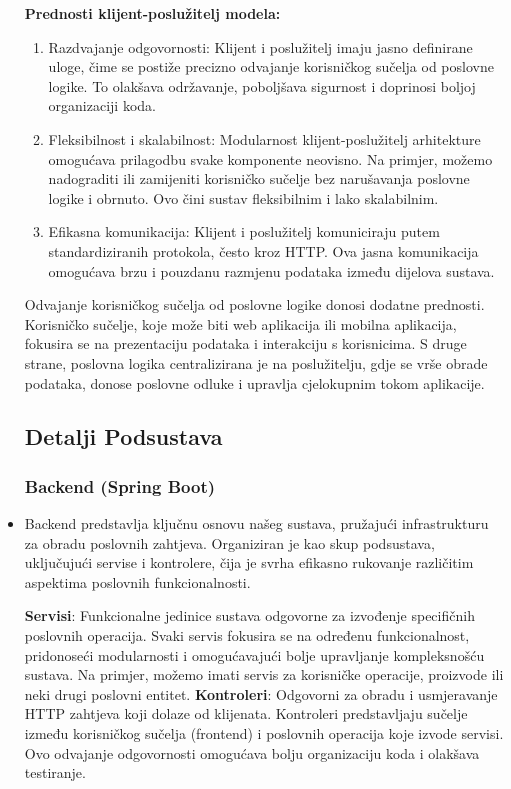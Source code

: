 \begin{itemize}
\textbf{Prednosti klijent-poslužitelj modela:}

\begin{enumerate}
    \item Razdvajanje odgovornosti: Klijent i poslužitelj imaju jasno definirane uloge, čime se postiže precizno odvajanje korisničkog sučelja od poslovne logike. To olakšava održavanje, poboljšava sigurnost i doprinosi boljoj organizaciji koda.
    \item Fleksibilnost i skalabilnost: Modularnost klijent-poslužitelj arhitekture omogućava prilagodbu svake komponente neovisno. Na primjer, možemo nadograditi ili zamijeniti korisničko sučelje bez narušavanja poslovne logike i obrnuto. Ovo čini sustav fleksibilnim i lako skalabilnim.
    \item Efikasna komunikacija: Klijent i poslužitelj komuniciraju putem standardiziranih protokola, često kroz HTTP. Ova jasna komunikacija omogućava brzu i pouzdanu razmjenu podataka između dijelova sustava.
\end{enumerate}
 
Odvajanje korisničkog sučelja od poslovne logike donosi dodatne prednosti. Korisničko sučelje, koje može biti web aplikacija ili mobilna aplikacija, fokusira se na prezentaciju podataka i interakciju s korisnicima. S druge strane, poslovna logika centralizirana je na poslužitelju, gdje se vrše obrade podataka, donose poslovne odluke i upravlja cjelokupnim tokom aplikacije. 

\subsection*{Detalji Podsustava}
\subsubsection*{Backend (Spring Boot)}
\item Backend predstavlja ključnu osnovu našeg sustava, pružajući infrastrukturu za obradu poslovnih zahtjeva. Organiziran je kao skup podsustava, uključujući servise i kontrolere, čija je svrha efikasno rukovanje različitim aspektima poslovnih funkcionalnosti.

\textbf{Servisi}: Funkcionalne jedinice sustava odgovorne za izvođenje specifičnih poslovnih operacija. Svaki servis fokusira se na određenu funkcionalnost, pridonoseći modularnosti i omogućavajući bolje upravljanje kompleksnošću sustava. Na primjer, možemo imati servis za korisničke operacije, proizvode ili neki drugi poslovni entitet.\newline
\textbf{Kontroleri}: Odgovorni za obradu i usmjeravanje HTTP zahtjeva koji dolaze od klijenata. Kontroleri predstavljaju sučelje između korisničkog sučelja (frontend) i poslovnih operacija koje izvode servisi. Ovo odvajanje odgovornosti omogućava bolju organizaciju koda i olakšava testiranje.




\end{itemize}
